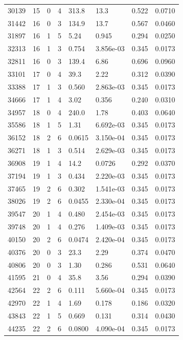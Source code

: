 \documentclass[preview]{standalone}
\begin{document}
{{{\begin{tabular}{L{1.2cm}C{1.2cm} C{0.3cm}C{0.5cm} C{1.4cm}C{1.4cm} C{1.4cm}C{1.4cm}}
  30139  &    15  & 0     &  4 &  313.8  & 13.3  & 0.522 &  0.0710   \\ 
  31442  &    16  & 0     &  3 &  134.9  & 13.7  & 0.567 &  0.0460   \\ 
  31897  &    16  & 1     &  5 &  5.24  & 0.945  & 0.294 &  0.0250   \\ 
  32313  &    16  & 1     &  3 &  0.754  & 3.856e-03  & 0.345 &  0.0173   \\ 
  32811  &    16  & 0     &  3 &  139.4  & 6.86  & 0.696 &  0.0960   \\ 
  33101  &    17  & 0     &  4 &  39.3  & 2.22  & 0.312 &  0.0390   \\ 
  33388  &    17  & 1     &  3 &  0.560  & 2.863e-03  & 0.345 &  0.0173   \\ 
  34666  &    17  & 1     &  4 &  3.02  & 0.356  & 0.240 &  0.0310   \\ 
  34957  &    18  & 0     &  4 &  240.0  & 1.78  & 0.403 &  0.0640   \\ 
  35586  &    18  & 1     &  5 &  1.31  & 6.692e-03  & 0.345 &  0.0173   \\ 
  36152  &    18  & 2     &  6 &  0.0615  & 3.150e-04  & 0.345 &  0.0173   \\ 
  36271  &    18  & 1     &  3 &  0.514  & 2.629e-03  & 0.345 &  0.0173   \\ 
  36908  &    19  & 1     &  4 &  14.2  & 0.0726  & 0.292 &  0.0370   \\ 
  37194  &    19  & 1     &  3 &  0.434  & 2.220e-03  & 0.345 &  0.0173   \\ 
  37465  &    19  & 2     &  6 &  0.302  & 1.541e-03  & 0.345 &  0.0173   \\ 
  38026  &    19  & 2     &  6 &  0.0455  & 2.330e-04  & 0.345 &  0.0173   \\ 
  39547  &    20  & 1     &  4 &  0.480  & 2.454e-03  & 0.345 &  0.0173   \\ 
  39748  &    20  & 1     &  4 &  0.276  & 1.409e-03  & 0.345 &  0.0173   \\ 
  40150  &    20  & 2     &  6 &  0.0474  & 2.420e-04  & 0.345 &  0.0173   \\ 
  40376  &    20  & 0     &  3 &  23.3  & 2.29  & 0.374 &  0.0470   \\ 
  40806  &    20  & 0     &  3 &  1.30  & 0.286  & 0.531 &  0.0640   \\ 
  41595  &    21  & 0     &  4 &  35.8  & 3.56  & 0.294 &  0.0390   \\ 
  42564  &    22  & 2     &  6 &  0.111  & 5.660e-04  & 0.345 &  0.0173   \\ 
  42970  &    22  & 1     &  4 &  1.69  & 0.178  & 0.186 &  0.0320   \\ 
  43843  &    22  & 1     &  5 &  0.669  & 0.131  & 0.314 &  0.0430   \\ 
  44235  &    22  & 2     &  6 &  0.0800  & 4.090e-04  & 0.345 &  0.0173   \\ 
\hline 
\end{tabular} 

}}}
\end{document}
